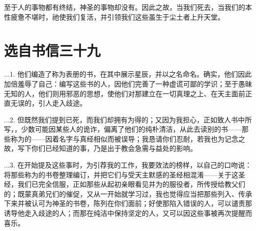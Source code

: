 至于人的事物都有终结，神圣的事物却没有。因此之故，当我们死去，当我们的本性疲惫不堪时，祂使我们复活，并引领我们这些虽生于尘土者上升天堂。\par



\section{选自书信三十九}

\par

...1. 他们编造了称为表册的书，在其中展示星辰，并以之名命名。确实，他们因此加倍羞辱了自己：编写这些书的人，因他们完善了一种虚谎可鄙的学识；至于愚昧无知的人，他们则用邪恶的思想，使他们对那建立在一切真理之上、在天主面前正直无误的，引人走入歧途。\par

...2. 但既然我们提到已死，而我们却拥有为得的；又因为我担心，正如致人书中所写，，少数可能因某些人的诡诈，偏离了他们的纯朴清洁，从此去读别的书——那些称为的——因着名字与真经相似而被误导；我恳请你们忍耐，若我也为记念之故，写下你们已经知道的事，乃是出于教会急需与益处的影响。\par

...3. 在开始提及这些事时，为引荐我的工作，我要效法的榜样，以自己的口吻说：  将那些称为的书卷整理编订，并把它们与受天主默感的圣经相混淆——关于这圣经，我们已完全信服，正如那些从起初亲眼看见并为的服役者，所传授给教父们的；既蒙真弟兄们的催促，又从一开始就学习过，我也觉得应当把那些列入、传承下来并被认可为神圣的书卷，陈列在你们面前；好使那陷入错误的人，可以谴责那诱导他走入歧途的人；而那在纯洁中保持坚定的人，又可以因这些事被再次提醒而喜乐。\par

